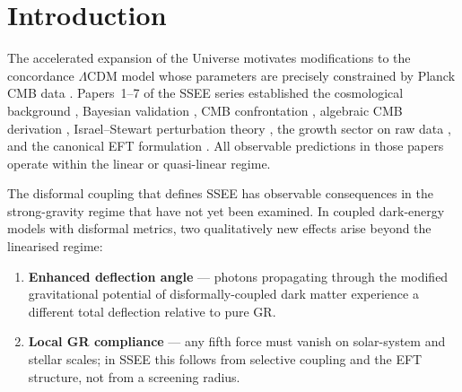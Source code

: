 \documentclass[12pt,a4paper]{article}
\begin{document}
\clearpage
{\small\tableofcontents}
\clearpage

\section{Introduction}
\label{sec:intro}

The accelerated expansion of the Universe \citep{Riess1998,Perlmutter1999}
motivates modifications to the concordance $\Lambda$CDM model whose
parameters are precisely constrained by Planck CMB data \citep{Planck2018}.
Papers~1--7 of the SSEE series established the cosmological background
\citep{ssee_paper1}, Bayesian validation \citep{ssee_paper2}, CMB
confrontation \citep{ssee_paper3}, algebraic CMB derivation
\citep{ssee_paper4}, Israel--Stewart perturbation theory
\citep{ssee_paper5}, the growth sector on raw data \citep{ssee_paper6},
and the canonical EFT formulation \citep{ssee_paper7}.
All observable predictions in those papers operate within the linear or
quasi-linear regime.

The disformal coupling that defines SSEE has observable consequences in
the strong-gravity regime that have not yet been examined.
In coupled dark-energy models with disformal metrics, two qualitatively
new effects arise beyond the linearised regime:
\begin{enumerate}
  \item \textbf{Enhanced deflection angle} --- photons propagating through the
        modified gravitational potential of disformally-coupled dark matter
        experience a different total deflection relative to pure GR.
  \item \textbf{Local GR compliance} --- any fifth force must vanish on
        solar-system and stellar scales; in SSEE this follows from selective
        coupling and the EFT structure, not from a screening radius.
\end{enumerate}
\end{document}
